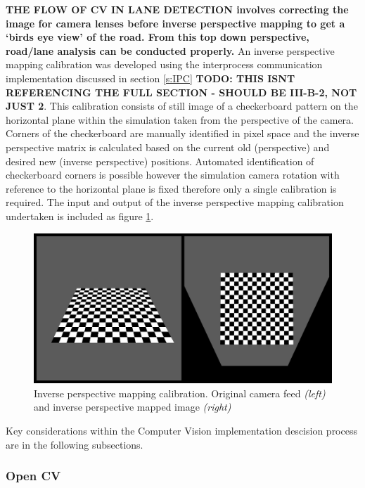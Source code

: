 \documentclass[]{aiaa-tc}%
\begin{document}
\textbf{THE FLOW OF CV IN LANE DETECTION involves correcting the image for camera lenses before inverse perspective mapping to get a `birds eye view' of the road. From this top down perspective, road/lane analysis can be conducted properly.} An inverse perspective mapping calibration was developed using the interprocess communication implementation discussed in section \ref{s:IPC} \textbf{TODO: THIS ISNT REFERENCING THE FULL SECTION - SHOULD BE III-B-2, NOT JUST 2}. This calibration consists of still image of a checkerboard pattern on the horizontal plane within the simulation taken from the perspective of the camera. Corners of the checkerboard are manually identified in pixel space and the inverse perspective matrix is calculated based on the current old (perspective) and desired new (inverse perspective) positions. Automated identification of checkerboard corners is possible however the simulation camera rotation with reference to the horizontal plane is fixed therefore only a single calibration is required. The input and output of the inverse perspective mapping calibration undertaken is included as figure \ref{f:inverse_perspective_calibration}.

\begin{figure}[htb]%
	\includegraphics{InversePerspectiveEg.png}
	\caption{Inverse perspective mapping calibration. Original camera feed \textit{(left)} and inverse perspective mapped image \textit{(right)}}
	\label{f:inverse_perspective_calibration}
\end{figure}

Key considerations within the Computer Vision implementation descision process are in the following subsections.

\subsubsection{Open CV}\label{s:openCV}
\end{document}

